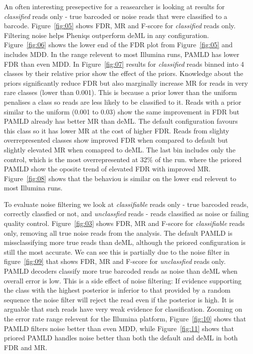 \documentclass[10pt,twocolumn]{article}
\begin{document}
An often interesting presepective for a reasearcher is looking at results for \emph{classified} reads only - true barcoded or noise reads that were classified to a barcode. Figure~\ref{fig:05} shows FDR, MR and F-score for \emph{classified} reads only. Filtering noise helps Pheniqs outperform deML in any configuration. Figure~\ref{fig:06} shows the lower end of the FDR plot from Figure~\ref{fig:05} and includes MDD. In the range relevent to most Illumina runs, PAMLD has lower FDR than even MDD. In Figure~\ref{fig:07} results for \emph{classified} reads binned into 4 classes by their relative prior show the effect of the priors. Knowledge about the priors significantly reduce FDR but also marginally increase MR for reads in very rare classes (lower than 0.001). This is because a prior lower than the uniform penalises a class so reads are less likely to be classified to it. Reads with a prior similar to the uniform (0.001 to 0.03) show the same improvement in FDR but PAMLD already has better MR than deML. The default configuration favours this class so it has lower MR at the cost of higher FDR. Reads from slighty overrepresented classes show improved FDR when compared to default but slightly elevated MR when comapred to deML. The last bin includes only the control, which is the most overrepresented at 32\% of the run. where the priored PAMLD show the oposite trend of elevated FDR with improved MR. Figure~\ref{fig:08} shows that the behaviou is similar on the lower end relevent to most Illumina runs.

To evaluate noise filtering we look at \emph{classifiable} reads only - true barcoded reads, correctly classfied or not, and \emph{unclassfied} reads - reads classified as noise or failing quality control. Figure~\ref{fig:03} shows FDR, MR and F-score for \emph{classifiable} reads only, removing all true noise reads from the analysis. The default PAMLD is missclassifying more true reads than deML, although the priored configuration is still the most accurate. We can see this is partially due to the noise filter in figure~\ref{fig:09} that shows FDR, MR and F-score for \emph{unclassfied} reads only. PAMLD decoders classify more true barcoded reads as noise than deML when overall error is low. This is a side effect of noise filtering: If evidence supporting the class with the highest posterior is inferior to that provided by a random sequence the noise filter will reject the read even if the posterior is high. It is arguable that such reads have very weak evidence for classification. Zooming on the error rate range relevent for the Illumina platform, Figure~\ref{fig:10} shows that PAMLD filters noise better than even MDD, while Figure~\ref{fig:11} shows that priored PAMLD handles noise better than both the default and deML in both FDR and MR.
\end{document}
